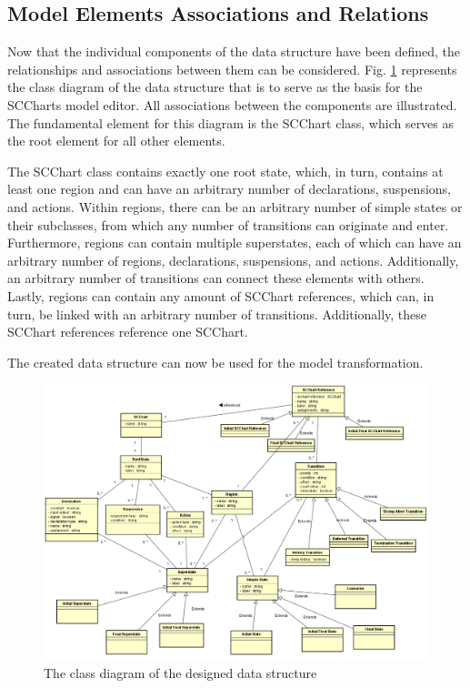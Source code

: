 \subsection{Model Elements Associations and Relations}
Now that the individual components of the data structure have been defined, the relationships and associations between them can be considered. Fig. \ref{fig:ClassDiagramAssociation} represents the class diagram of the data structure that is to serve as the basis for the SCCharts model editor. All associations between the components are illustrated. The fundamental element for this diagram is the SCChart class, which serves as the root element for all other elements. 

The SCChart class contains exactly one root state, which, in turn, contains at least one region and can have an arbitrary number of declarations, suspensions, and actions. Within regions, there can be an arbitrary number of simple states or their subclasses, from which any number of transitions can originate and enter. Furthermore, regions can contain multiple superstates, each of which can have an arbitrary number of regions, declarations, suspensions, and actions. Additionally, an arbitrary number of transitions can connect these elements with others. Lastly, regions can contain any amount of SCChart references, which can, in turn, be linked with an arbitrary number of transitions. Additionally, these SCChart references reference one SCChart.

The created data structure can now be used for the model transformation.
\begin{figure}[h!]
\centering
\includegraphics[width=1.0\textwidth]{bilder/ClassDiagramAssociation.png}
\caption{The class diagram of the designed data structure}
\label{fig:ClassDiagramAssociation}
\end{figure} 
